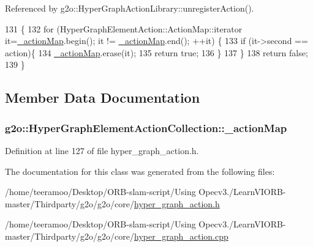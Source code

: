 Referenced by g2o\+::\+Hyper\+Graph\+Action\+Library\+::unregister\+Action().


\begin{DoxyCode}
131   \{
132     \textcolor{keywordflow}{for} (HyperGraphElementAction::ActionMap::iterator it=\hyperlink{classg2o_1_1HyperGraphElementActionCollection_a637c13fca95eacab38ee82eedd3669e4}{\_actionMap}.begin(); it != 
      \hyperlink{classg2o_1_1HyperGraphElementActionCollection_a637c13fca95eacab38ee82eedd3669e4}{\_actionMap}.end(); ++it) \{
133       \textcolor{keywordflow}{if} (it->second == action)\{
134         \hyperlink{classg2o_1_1HyperGraphElementActionCollection_a637c13fca95eacab38ee82eedd3669e4}{\_actionMap}.erase(it);
135         \textcolor{keywordflow}{return} \textcolor{keyword}{true};
136       \}
137     \}
138     \textcolor{keywordflow}{return} \textcolor{keyword}{false};
139   \}
\end{DoxyCode}


\subsection{Member Data Documentation}
\subsubsection[{\texorpdfstring{\+\_\+action\+Map}{_actionMap}}]{ g2o\+::\+Hyper\+Graph\+Element\+Action\+Collection\+::\+\_\+action\+Map\hspace{0.3cm}{\ttfamily [protected]}}\hypertarget{classg2o_1_1HyperGraphElementActionCollection_a637c13fca95eacab38ee82eedd3669e4}{}\label{classg2o_1_1HyperGraphElementActionCollection_a637c13fca95eacab38ee82eedd3669e4}


Definition at line 127 of file hyper\+\_\+graph\+\_\+action.\+h.



The documentation for this class was generated from the following files\+:\begin{DoxyCompactItemize}
\item 
/home/teeramoo/\+Desktop/\+O\+R\+B-\/slam-\/script/\+Using Opecv3./\+Learn\+V\+I\+O\+R\+B-\/master/\+Thirdparty/g2o/g2o/core/\hyperlink{hyper__graph__action_8h}{hyper\+\_\+graph\+\_\+action.\+h}\item 
/home/teeramoo/\+Desktop/\+O\+R\+B-\/slam-\/script/\+Using Opecv3./\+Learn\+V\+I\+O\+R\+B-\/master/\+Thirdparty/g2o/g2o/core/\hyperlink{hyper__graph__action_8cpp}{hyper\+\_\+graph\+\_\+action.\+cpp}\end{DoxyCompactItemize}
